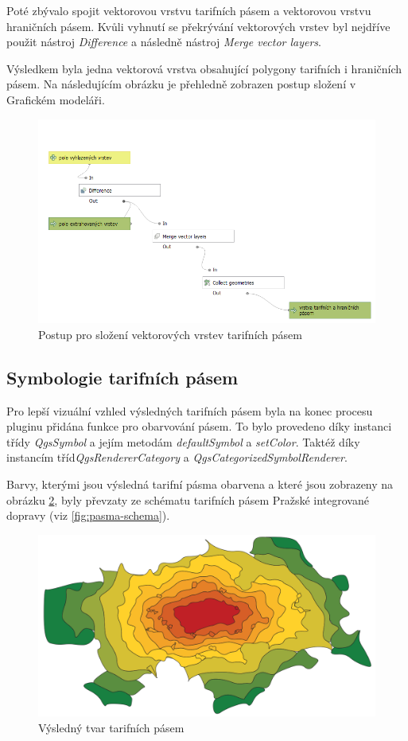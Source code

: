 Poté zbývalo spojit vektorovou vrstvu tarifních pásem a vektorovou vrstvu hra\-ničních pásem. Kvůli vyhnutí se 
překrývání vektorových vrstev byl nejdříve použit nástroj \textit{Difference} a následně nástroj  \textit{Merge vector layers}.

Výsledkem byla jedna vektorová vrstva obsahující polygony tarifních i hraničních pásem. Na následujícím obrázku
je přehledně zobrazen postup složení v Grafickém modeláři.

\begin{figure}[H] \centering
    \includegraphics[width=400pt]{./pictures/postup-collecting.png}
    \caption[Postup pro složení vektorových vrstev tarifních pásem]{Postup pro složení vektorových vrstev tarifních pásem}
	\label{fig:postup-collecting}              
\end{figure}

\subsection{Symbologie tarifních pásem}
\label{symbologie}

Pro lepší vizuální vzhled výsledných tarifních pásem byla na konec procesu pluginu přidána funkce
pro obarvování pásem. To bylo provedeno díky instanci třídy \textit{QgsSymbol} a jejím metodám 
\textit{defaultSymbol} a \textit{setColor}. Taktéž díky instancím tříd\textit{QgsRendererCategory}
a \textit{QgsCategorizedSymbolRenderer}.

Barvy, kterými jsou výsledná tarifní pásma obarvena a které jsou zobrazeny na obrázku \ref{fig:vysledek}, byly převzaty
ze schématu tarifních pásem Pražské integrované dopravy (viz \ref{fig:pasma-schema}).  

\begin{figure}[H] \centering
    \includegraphics[width=400pt]{./pictures/vysledek.png}
    \caption[Výsledný tvar tarifních pásem]{Výsledný tvar tarifních pásem}
	\label{fig:vysledek}              
\end{figure}